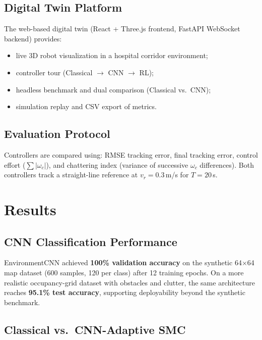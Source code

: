 \documentclass[11pt,a4paper]{article}
\begin{document}
\subsection{Digital Twin Platform}

The web-based digital twin (React + Three.js frontend, FastAPI WebSocket backend) provides:
\begin{itemize}
  \item live 3D robot visualization in a hospital corridor environment;
  \item controller tour (Classical $\rightarrow$ CNN $\rightarrow$ RL);
  \item headless benchmark and dual comparison (Classical vs.\ CNN);
  \item simulation replay and CSV export of metrics.
\end{itemize}

\subsection{Evaluation Protocol}

Controllers are compared using: RMSE tracking error, final tracking error, control effort ($\sum|\omega_c|$), and chattering index (variance of successive $\omega_c$ differences). Both controllers track a straight-line reference at $v_r = 0.3$\,m/s for $T = 20$\,s.

\section{Results}

\subsection{CNN Classification Performance}

EnvironmentCNN achieved \textbf{100\% validation accuracy} on the synthetic 64$\times$64 map dataset (600 samples, 120 per class) after 12 training epochs. On a more realistic occupancy-grid dataset with obstacles and clutter, the same architecture reaches \textbf{95.1\% test accuracy}, supporting deployability beyond the synthetic benchmark.

\subsection{Classical vs.\ CNN-Adaptive SMC}
\end{document}
